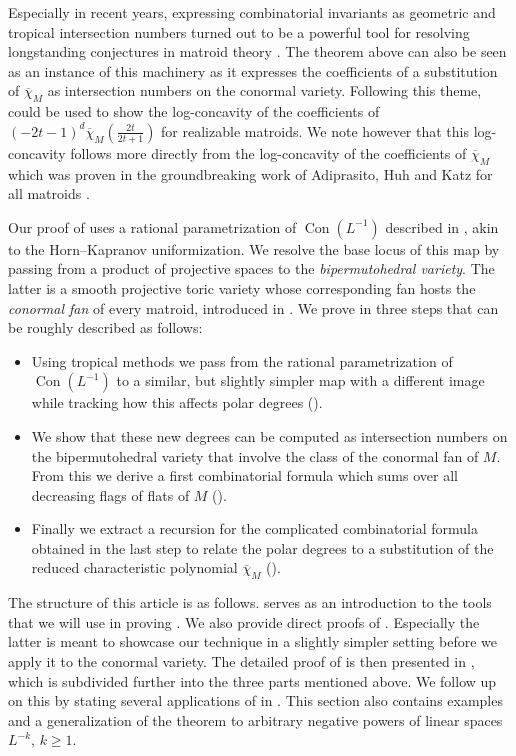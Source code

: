 \documentclass[12pt,a4paper,english]{scrartcl}
\DeclareMathOperator{\Con}{Con}
\begin{document}
Especially in recent years, expressing combinatorial invariants as geometric and tropical intersection numbers turned out to be a powerful tool for resolving longstanding conjectures in matroid theory \cite{adiprasito2018hodge,Ardila2022,braden2020singular}. The theorem above can also be seen as an instance of this machinery as it expresses the coefficients of a substitution of $\overline{\chi}_M$ as intersection numbers on the conormal variety. Following this theme,  could be used to show the log-concavity of the coefficients of $(-2t-1)^d\overline{\chi}_M\left(\frac{2t}{2t+1}\right)$ for realizable matroids. We note however that this log-concavity follows more directly from the log-concavity of the coefficients of $\overline{\chi}_M$ which was proven in the groundbreaking work of Adiprasito, Huh and Katz for all matroids \cite{adiprasito2018hodge}. \par
Our proof of  uses a rational parametrization of $\Con(L^{-1})$ described in \cite{MatsubaraHeoTelen2026}, akin to the Horn--Kapranov uniformization.  We resolve the base locus of this map by passing from a product of projective spaces to the \emph{bipermutohedral variety}. The latter is a smooth projective toric variety whose corresponding fan hosts the \emph{conormal fan} of every matroid, introduced in \cite{Ardila2022}. We prove  in three steps that can be roughly described as follows: \begin{itemize}
    \item Using tropical methods we pass from the rational parametrization of $\Con(L^{-1})$ to a similar, but slightly simpler map with a different image while tracking how this affects polar degrees ().
    \item We show that these new degrees can be computed as intersection numbers on the bipermutohedral variety that involve the class of the conormal fan of $M$. From this we derive a first combinatorial formula which sums over all decreasing flags of flats of $M$ ().
    \item Finally we extract a recursion for the complicated combinatorial formula obtained in the last step to relate the polar degrees to 
    a substitution of the reduced characteristic polynomial $\overline{\chi}_{M}$ ().
\end{itemize}

The structure of this article is as follows.  serves as an introduction to the tools that we will use in proving . We also provide direct proofs of . Especially the latter is meant to showcase our technique in a slightly simpler setting before we apply it to the conormal variety. The detailed proof of  is then presented in , which is subdivided further into the three parts mentioned above. We follow up on this by stating several applications of  in . This section also contains examples and a generalization of the theorem to arbitrary negative powers of linear spaces $L^{-k}$, $k\geq 1$.
\end{document}

